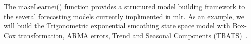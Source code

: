 \documentclass[12pt]{article}\usepackage[]{graphicx}\usepackage[]{color}
\makeatletter
\theoremstyle{definition}
\newcommand\code{\@codex}
\def\@codex#1{{\normalfont\ttfamily\hyphenchar\font=-1 #1}}
\newcommand{\pkg}[1]{{\fontseries{b}\selectfont #1}}
\makeatother
\begin{document}
The \code{makeLearner()} function provides a structured model building framework to the several forecasting models currently implimented in \pkg{mlr}. As an example, we will build the Trigonometric exponential smoothing state space model with Box-Cox transformation, ARMA errors, Trend and Seasonal Components (TBATS)~\cite{tbats}.

\end{document}
